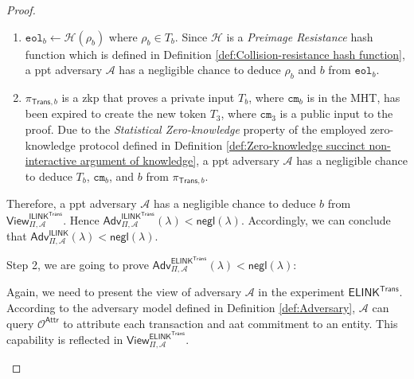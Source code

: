 \begin{proof}
\begin{enumerate}
    \item $\texttt{eol}_{b} \leftarrow \mathcal{H}(\rho_b)$ where $\rho_b \in T_b$. Since $\mathcal{H}$ is a \textit{Preimage Resistance} hash function which is defined in Definition \ref{def:Collision-resistance hash function}, a \gls{ppt} adversary $\mathcal{A}$ has a negligible chance to deduce $\rho_b$ and $b$ from $\texttt{eol}_{b}$. 
    
    \item $\pi_{\mathsf{Trans}, b}$ is a \gls{zkp} that proves a private input $T_b$, where $\texttt{cm}_b$ is in the \textsf{MHT}, has been expired to create the new token $T_3$, where $\texttt{cm}_3$ is a public input to the proof. Due to the \textit{Statistical Zero-knowledge} property of the employed zero-knowledge protocol defined in Definition \ref{def:Zero-knowledge succinct non-interactive argument of knowledge}, a \gls{ppt} adversary $\mathcal{A}$ has a negligible chance to deduce $T_b$, $\texttt{cm}_b$, and $b$ from $\pi_{\mathsf{Trans}, b}$. 
    
\end{enumerate}

Therefore, a \gls{ppt} adversary $\mathcal{A}$ has a negligible chance to deduce $b$ from $\mathsf{View}^{\mathsf{ILINK}^\mathsf{Trans}}_{\Pi, \mathcal{A}}$. Hence $\mathsf{Adv}^{\mathsf{ILINK}^\textsf{Trans}}_{\Pi, \mathcal{A}}(\lambda) < \mathsf{negl}(\lambda)$. Accordingly, we can conclude that $\mathsf{Adv}^{\mathsf{ILINK}}_{\Pi, \mathcal{A}}(\lambda) < \mathsf{negl}(\lambda)$.


Step 2, we are going to prove $\mathsf{Adv}^{\mathsf{ELINK}^\textsf{Trans}}_{\Pi, \mathcal{A}}(\lambda) < \mathsf{negl}(\lambda)$:

Again, we need to present the view of adversary $\mathcal{A}$ in the experiment $\mathsf{ELINK}^\mathsf{Trans}$. According to the adversary model defined in Definition \ref{def:Adversary}, $\mathcal{A}$ can query $\mathcal{O}^\mathsf{Attr}$ to attribute each transaction and \gls{aat} commitment to an entity. This capability is reflected in $\mathsf{View}^{\mathsf{ELINK}^\mathsf{Trans}}_{\Pi, \mathcal{A}}$.


\begin{figure}[!h]
    \resizebox{\linewidth}{!}{
    \begin{minipage}{\linewidth}
    

\end{minipage}}
\end{figure}
\end{proof}
